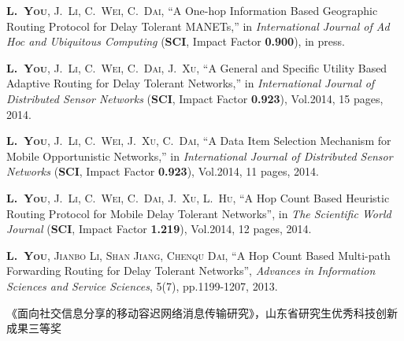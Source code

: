 \begin{publications}{99}
%
%
\item\textsc{\textbf{L.~You}, J.~Li, C.~Wei, C.~Dai}, ``A One-hop Information Based Geographic Routing Protocol for Delay Tolerant MANETs,'' in \textit{International Journal of Ad Hoc and Ubiquitous Computing} (\textbf{SCI}, Impact Factor \textbf{0.900}), in press.



%
\item\textsc{\textbf{L.~You}, J.~Li, C.~Wei, C.~Dai, J.~Xu}, ``A General and Specific Utility Based Adaptive Routing for Delay Tolerant Networks,'' in \textit{International Journal of Distributed Sensor Networks} (\textbf{SCI}, Impact Factor \textbf{0.923}), Vol.2014, 15 pages, 2014.


%
\item\textsc{\textbf{L.~You}, J.~Li, C.~Wei, J.~Xu, C.~Dai}, ``A Data Item Selection Mechanism for Mobile Opportunistic Networks,'' in \textit{International Journal of Distributed Sensor Networks} (\textbf{SCI}, Impact Factor \textbf{0.923}), Vol.2014, 11 pages, 2014.


%
\item\textsc{\textbf{L.~You}, J.~Li, C.~Wei, C.~Dai, J.~Xu, L.~Hu}, ``A Hop Count Based Heuristic Routing Protocol for Mobile Delay Tolerant Networks'', in \textit{The Scientific World Journal} (\textbf{SCI}, Impact Factor \textbf{1.219}), Vol.2014, 12 pages, 2014.


%
\item\textsc{\textbf{L.~You}, Jianbo Li, Shan Jiang, Chenqu Dai}, ``A Hop Count Based Multi-path Forwarding Routing for Delay Tolerant Networks'', {\it Advances in Information Sciences and Service Sciences}, 5(7), pp.1199-1207, 2013.


\item 《面向社交信息分享的移动容迟网络消息传输研究》，山东省研究生优秀科技创新成果三等奖
    
\end{publications}


